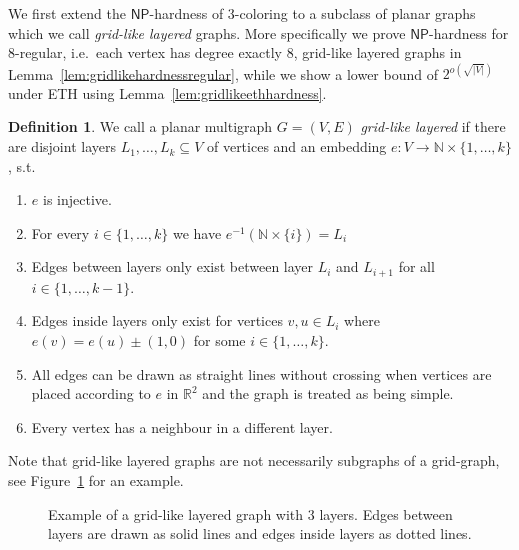 \documentclass[10pt,a4paper]{article}
\numberwithin{equation}{section}
\theoremstyle{definition}
\newtheorem{definition}[equation]{Definition}
\newcommand{\IN}{\mathbb{N}}
\newcommand{\IR}{\mathbb{R}}
\newcommand{\NP}{\ensuremath{\mathsf{NP}}}
\begin{document}
We first extend the $\NP$-hardness of $3$-coloring to a subclass of planar graphs which we call \emph{grid-like layered} graphs.
More specifically we prove $\NP$-hardness for $8$-regular, i.e.\ each vertex has degree exactly $8$, grid-like layered graphs in Lemma~\ref{lem:gridlikehardnessregular}, while we show a lower bound of $2^{o\left(\sqrt{|V|}\right)}$ under ETH using Lemma~\ref{lem:gridlikeethhardness}.
\enlargethispage{2ex}
\begin{definition}
    \label{def:gridlike}
    We call a planar multigraph $G = (V, E)$ \emph{grid-like layered} if there are disjoint layers $L_1, \ldots, L_k \subseteq V$ of vertices and an embedding $e: V \to \IN \times \{1,\ldots,k\}$, s.t.
    \begin{enumerate}
        \item $e$ is injective.
        \item For every $i \in \{1, \ldots, k\}$ we have $e^{-1}(\IN \times \{i\}) = L_i$
        \item Edges between layers only exist between layer $L_i$ and $L_{i+1}$ for all $i \in \{1, \ldots, k-1\}$.
        \item Edges inside layers only exist for vertices $v, u \in L_i$ where $e(v) = e(u) \pm (1,0)$ for some $i \in \{1, \ldots, k\}$.\label{itm:gridlikeeasylayer}
        \item All edges can be drawn as straight lines without crossing when vertices are placed according to $e$ in $\IR^2$ and the graph is treated as being simple.\label{itm:gridlikestraightplanar}
        \item Every vertex has a neighbour in a different layer.\label{itm:gridlikeneighbours}
    \end{enumerate}
\end{definition}
Note that grid-like layered graphs are not necessarily subgraphs of a grid-graph, see Figure~\ref{fig:gridlikeexample} for an example.
\begin{figure}[tpb]
    \centering
    \caption{Example of a grid-like layered graph with $3$ layers. Edges between layers are drawn as solid lines and edges inside layers as dotted lines.}
    \label{fig:gridlikeexample}
\end{figure}
\end{document}
